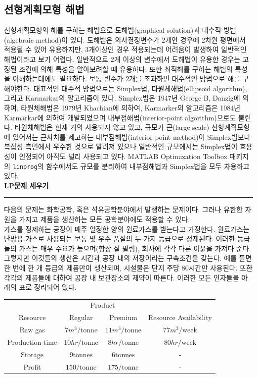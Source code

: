 \subsection{선형계획모형 해법}
선형계획모형의 해를 구하는 해법으로 도해법(graphical solution)과 대수적 방법(algebraic method)이 있다. 도해법은 의사결정변수가 2개인 경우에 2차원 평면에서 적용될 수 있어 유용하지만, 3개이상인 경우 적용되는데 어려움이 발생하여 일반적인 해법이라고 보기 어렵다. 일반적으로 2개 이상의 변수에서 도해법이 유용한 경우는 고정된 조건에 의해 특성을 알아보려할 때 유용하다. 또한 최적해를 구하는 해법의 특성을 이해하는데에도 필요하다. 보통 변수가 2개를 초과하면 대수적인 방법으로 해를 구해야한다. 대표적인 대수적 방법으로는 Simplex법, 타원체해법(ellipsoid algorithm), 그리고 Karmarkar의 알고리즘이 있다. Simplex법은 1947년 George B, Danzig에 의하여, 타원체해법은 1979년 Khachian에 의하여, Karmarker의 알고리즘은 1984년 Karmarkar에 의하여 개발되었으며 내부점해법(interior-point algorithm)으로도 불린다. 타원체해법은 현재 거의 사용되지 않고 있고, 규모가 큰(large scale) 선형계획모형에 있어서는 근사치를 제고하는 내부점해법(interior-point method)이 Simplex법보다 복잡성 측면에서 우수한 것으로 알려져 있으나 일반적인 규모에서는 Simplex법이 효용성이 인정되어 아직도 널리 사용되고 있다. MATLAB Optimization Toolbox 패키지의 \texttt{linprog}의 함수에서도 규모를 분리하여 내부점해법과 Simplex법을 모두 차용하고 있다.\\
 \textbf{LP문제 세우기}\\
\rule{\textwidth}{0.1pt}
다음의 문제는 화학공학, 혹은 석유공학분야에서 발생하는 문제이다. 그러나 유한한 자원을 가지고 제품을 생산하는 모든 공학분야에도 적용할 수 있다.\\
가스를 정제하는 공장이 매주 일정한 양의 원료가스를 받는다고 가정한다. 원료가스는 난방용 가스로 사용되는 보통 및 우수 품질의 두 가지 등급으로 정제된다. 이러한 등급들의 가스는 매우 수요가 높으며(항상 잘 팔림), 회사에 각각 다른 이윤을 가져다 준다. 그렇지만 이것들의 생산은 시간과 공장 내의 저장이라는 구속조건을 갖는다. 예를 들면 한 번에 한 개 등급의 제품만이 생산되며, 시설물은 단지 주당 80시간만 사용된다. 또한 각각의 제품들에 대하여 공장 내 보관장소의 제약이 따른다. 이러한 모든 인자들을 아래의 표로 정리되어 있다.
\begin{table}[!hbt]
\centering
\begin{tabular}{c|c|c|c}
\hline\hline
&\multicolumn{2}{c|}{Product}&\\
\cline{2-3}
Resource&Regular&Premium&Resource Availability\\
\hline
Raw gas& $7m^{3}/\text{tonne}$ & $11m^{3}/\text{tonne}$ & $77m^{3}/\text{week}$\\
Production time& $10hr/\text{tonne}$ & $8hr/\text{tonne}$ & $80hr/\text{week}$\\
Storage& $9\text{tonnes}$ & $6\text{tonnes}$ & -\\
\hline
Profit& $150/\text{tonne}$ & $175/\text{tonne}$ & -\\
\hline\hline
\end{tabular}
\end{table}
